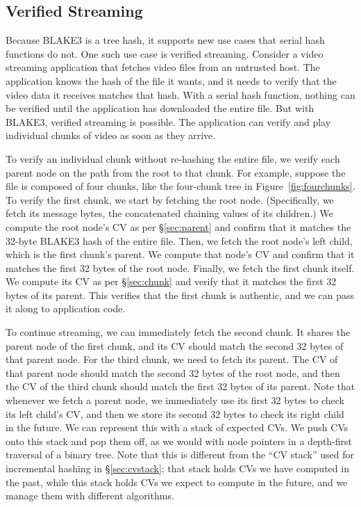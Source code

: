 \documentclass[11pt,notitlepage,a4paper]{article}
\begin{document}
\subsection{Verified Streaming}\label{sec:verifiedstreaming}

Because BLAKE3 is a tree hash, it supports new use cases that serial hash
functions do not. One such use case is verified streaming. Consider a video
streaming application that fetches video files from an untrusted host. The
application knows the hash of the file it wants, and it needs to verify that
the video data it receives matches that hash. With a serial hash function,
nothing can be verified until the application has downloaded the entire file.
But with BLAKE3, verified streaming is possible. The application can verify and
play individual chunks of video as soon as they arrive.

To verify an individual chunk without re-hashing the entire file, we verify
each parent node on the path from the root to that chunk. For example, suppose
the file is composed of four chunks, like the four-chunk tree in
Figure~\ref{fig:fourchunks}. To verify the first chunk, we start by fetching
the root node. (Specifically, we fetch its message bytes, the concatenated
chaining values of its children.) We compute the root node's CV as per
\S\ref{sec:parent} and confirm that it matches the 32-byte BLAKE3 hash of the
entire file. Then, we fetch the root node's left child, which is the first
chunk's parent. We compute that node's CV and confirm that it matches the first
32 bytes of the root node. Finally, we fetch the first chunk itself. We compute
its CV as per \S\ref{sec:chunk} and verify that it matches the first 32 bytes
of its parent. This verifies that the first chunk is authentic, and we can pass
it along to application code.

To continue streaming, we can immediately fetch the second chunk. It shares the
parent node of the first chunk, and its CV should match the second 32 bytes of
that parent node. For the third chunk, we need to fetch its parent. The CV of
that parent node should match the second 32 bytes of the root node, and then
the CV of the third chunk should match the first 32 bytes of its parent. Note
that whenever we fetch a parent node, we immediately use its first 32 bytes to
check its left child's CV, and then we store its second 32 bytes to check its
right child in the future. We can represent this with a stack of expected CVs.
We push CVs onto this stack and pop them off, as we would with node pointers in
a depth-first traversal of a binary tree. Note that this is different from the
``CV stack'' used for incremental hashing in \S\ref{sec:cvstack}; that stack
holds CVs we have computed in the past, while this stack holds CVs we expect to
compute in the future, and we manage them with different algorithms.
\end{document}
